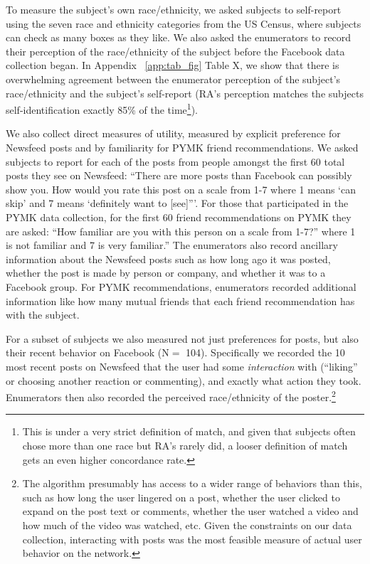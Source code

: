 \documentclass[12pt,letterpaper]{article}
\newcommand{\RecentInteractionsSampleSize}{104}
\begin{document}
To measure the subject's own race/ethnicity, we asked subjects to self-report using the seven race and ethnicity categories from the US Census, where subjects can check as many boxes as they like. We also asked the enumerators to record their perception of the race/ethnicity of the subject before the Facebook data collection began. In Appendix ~\ref{app:tab_fig} Table X, we show that there is overwhelming agreement between the enumerator perception of the subject's race/ethnicity and the subject's self-report (RA's perception matches the subjects self-identification exactly 85\% of the time\footnote{This is under a very strict definition of match, and given that subjects often chose more than one race but RA's rarely did, a looser definition of match gets an even higher concordance rate.}).

We also collect direct measures of utility, measured by explicit preference for Newsfeed posts and by familiarity for PYMK friend recommendations. We asked subjects to report for each of the posts from people amongst the first 60 total posts they see on Newsfeed: “There are more posts than Facebook can possibly show you. How would you rate this post on a scale from 1-7 where 1 means ‘can skip’ and 7 means ‘definitely want to [see]'''. For those that participated in the PYMK data collection, for the first 60 friend recommendations on PYMK they are asked: “How familiar are you with this person on a scale from 1-7?” where 1 is not familiar and 7 is very familiar.'' The enumerators also record ancillary information about the Newsfeed posts such as how long ago it was posted, whether the post is made by person or company, and whether it was to a Facebook group. For PYMK recommendations, enumerators recorded additional information like how many mutual friends that each friend recommendation has with the subject.

For a subset of subjects we also measured not just preferences for posts, but also their recent behavior on Facebook (N$=$ \RecentInteractionsSampleSize). Specifically we recorded the 10 most recent posts on Newsfeed that the user had some \emph{interaction} with (``liking'' or choosing another reaction or commenting), and exactly what action they took. Enumerators then also recorded the perceived race/ethnicity of the poster.\footnote{The algorithm presumably has access to a wider range of behaviors than this, such as how long the user lingered on a post, whether the user clicked to expand on the post text or comments, whether the user watched a video and how much of the video was watched, etc. Given the constraints on our data collection, interacting with posts was the most feasible measure of actual user behavior on the network.} 
\end{document}
